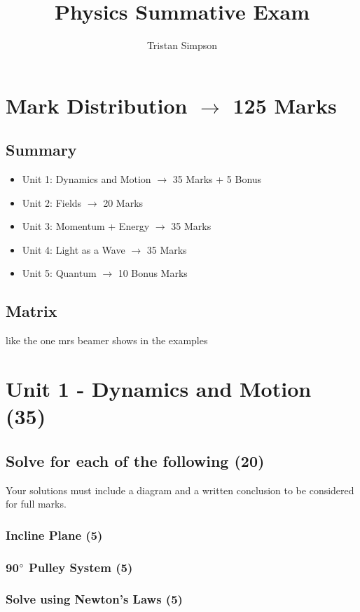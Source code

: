 \documentclass{article}
\title{Physics Summative Exam}
\author{Tristan Simpson}
\begin{document}
\maketitle
\tableofcontents
\doublespacing

\section{Mark Distribution $\to$ 125 Marks}
\subsection{Summary}
\begin{itemize}
    \item Unit 1: Dynamics and Motion $\to$ 35 Marks + 5 Bonus
    \item Unit 2: Fields $\to$ 20 Marks
    \item Unit 3: Momentum + Energy $\to$ 35 Marks
    \item Unit 4: Light as a Wave $\to$ 35 Marks
    \item Unit 5: Quantum $\to$ 10 Bonus Marks
\end{itemize}

\subsection{Matrix}
like the one mrs beamer shows in the examples

\section{Unit 1 - Dynamics and Motion (35)}
\subsection{Solve for each of the following (20)}
Your solutions must include a diagram and a written conclusion to be considered for full marks.

\subsubsection{Incline Plane (5)}
\subsubsection{90$\degree$ Pulley System (5)}
\subsubsection{Solve using Newton's Laws (5)}
\end{document}
